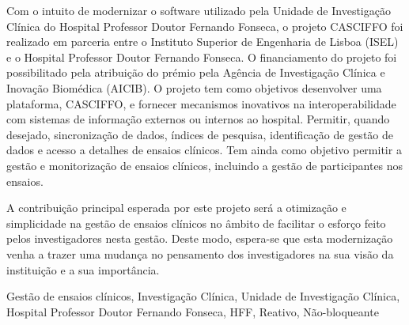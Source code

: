 \abstractPT  %

Com o intuito de modernizar o software utilizado pela Unidade de Investigação Clínica do Hospital Professor Doutor Fernando Fonseca, o projeto CASCIFFO foi realizado em parceria entre o Instituto Superior de Engenharia de Lisboa (ISEL) e o Hospital Professor Doutor Fernando Fonseca. O financiamento do projeto foi possibilitado pela atribuição do prémio pela Agência de Investigação Clínica
e Inovação Biomédica (AICIB).
O projeto tem como objetivos desenvolver uma plataforma, CASCIFFO, e fornecer mecanismos inovativos na interoperabilidade com sistemas de informação externos ou internos ao hospital. Permitir, quando desejado, sincronização de dados, índices de pesquisa, identificação de gestão de dados e acesso a detalhes de ensaios clínicos. Tem ainda como objetivo permitir a gestão e monitorização de ensaios clínicos, incluindo a gestão de participantes nos ensaios.

A contribuição principal esperada por este projeto será a otimização e simplicidade na gestão de ensaios clínicos no âmbito de facilitar o esforço feito pelos investigadores nesta gestão.
Deste modo, espera-se que esta modernização venha a trazer uma mudança no pensamento dos investigadores na sua visão da instituição e a sua importância.










\begin{keywords}
Gestão de ensaios clínicos, Investigação Clínica, Unidade de Investigação Clínica, Hospital Professor Doutor Fernando Fonseca, HFF, Reativo, Não-bloqueante
\end{keywords} 
